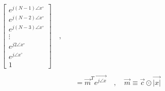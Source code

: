 \documentclass{article}
\begin{document}
\begin{align*}
\begin{bmatrix}
                                                e^{j(N - 1)\angle{x}^{\circ}} \\
                                                e^{j(N - 2)\angle{x}^{\circ}} \\
                                                e^{j(N - 3)\angle{x}^{\circ}} \\
                                                \vdots \\
                                                e^{j2\angle{x}^{\circ}} \\
                                                e^{j\angle{x}^{\circ}} \\
                                                1
                                              \end{bmatrix} \quad , \quad \\ \\
            &= \vec{m}^{T}\vec{e^{j\angle{x}}} \quad , \quad \vec{m} \equiv \vec{c} \odot \vec{|x|} 
\end{align*}
\end{document}
